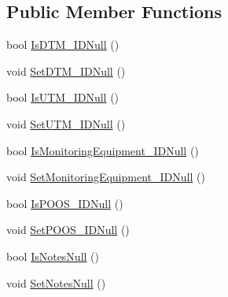 \subsection*{Public Member Functions}
\begin{DoxyCompactItemize}
\item 
bool \hyperlink{class_env_int_1_1_win32_1_1_field_tech_1_1_manager_1_1_data_sets_1_1_guide_ware_mobile_data_set_1_1_component_row_a1428c535148aee987edd984ef0123ce5}{Is\+D\+T\+M\+\_\+\+I\+D\+Null} ()
\item 
void \hyperlink{class_env_int_1_1_win32_1_1_field_tech_1_1_manager_1_1_data_sets_1_1_guide_ware_mobile_data_set_1_1_component_row_a543c58488d986897b3357e62dd23e445}{Set\+D\+T\+M\+\_\+\+I\+D\+Null} ()
\item 
bool \hyperlink{class_env_int_1_1_win32_1_1_field_tech_1_1_manager_1_1_data_sets_1_1_guide_ware_mobile_data_set_1_1_component_row_a13b84f055d9721d0982a280efce1b12b}{Is\+U\+T\+M\+\_\+\+I\+D\+Null} ()
\item 
void \hyperlink{class_env_int_1_1_win32_1_1_field_tech_1_1_manager_1_1_data_sets_1_1_guide_ware_mobile_data_set_1_1_component_row_ab9cc78ae6251f39edbb1d4cecb3da26d}{Set\+U\+T\+M\+\_\+\+I\+D\+Null} ()
\item 
bool \hyperlink{class_env_int_1_1_win32_1_1_field_tech_1_1_manager_1_1_data_sets_1_1_guide_ware_mobile_data_set_1_1_component_row_ad8c200929b7da339d1b687b07a6ee31c}{Is\+Monitoring\+Equipment\+\_\+\+I\+D\+Null} ()
\item 
void \hyperlink{class_env_int_1_1_win32_1_1_field_tech_1_1_manager_1_1_data_sets_1_1_guide_ware_mobile_data_set_1_1_component_row_a7dd1a3633d997dd55f7bcad101a59162}{Set\+Monitoring\+Equipment\+\_\+\+I\+D\+Null} ()
\item 
bool \hyperlink{class_env_int_1_1_win32_1_1_field_tech_1_1_manager_1_1_data_sets_1_1_guide_ware_mobile_data_set_1_1_component_row_a8b3536c1ffd19ad8d74301540e5bb665}{Is\+P\+O\+O\+S\+\_\+\+I\+D\+Null} ()
\item 
void \hyperlink{class_env_int_1_1_win32_1_1_field_tech_1_1_manager_1_1_data_sets_1_1_guide_ware_mobile_data_set_1_1_component_row_a085fef65da16366b3ecf9a26becf0215}{Set\+P\+O\+O\+S\+\_\+\+I\+D\+Null} ()
\item 
bool \hyperlink{class_env_int_1_1_win32_1_1_field_tech_1_1_manager_1_1_data_sets_1_1_guide_ware_mobile_data_set_1_1_component_row_a9aa0bd16e8943c8fc056f3f3c7e4e46e}{Is\+Notes\+Null} ()
\item 
void \hyperlink{class_env_int_1_1_win32_1_1_field_tech_1_1_manager_1_1_data_sets_1_1_guide_ware_mobile_data_set_1_1_component_row_a15d47f859076eef60f0aa6916d61c622}{Set\+Notes\+Null} ()

\end{DoxyCompactItemize}
